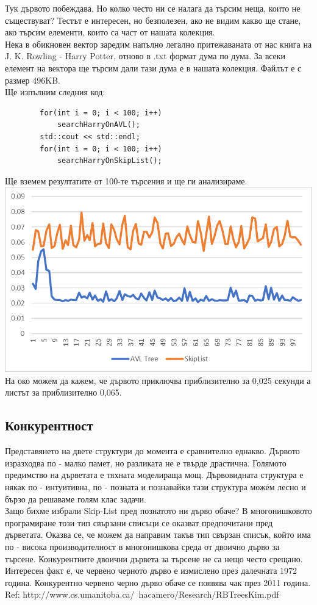 \documentclass[a4paper,12pt,fleqn]{article}
\begin{document}
	Тук дървото побеждава. Но колко често ни се налага да търсим неща, които не съществуват? Тестът е интересен, но безполезен, ако не видим какво ще стане, ако търсим елементи, които са част от нашата колекция.\\
	Нека в обикновен вектор заредим напълно легално притежаваната от нас книга на J. K. Rowling - Harry Potter, отново в .txt формат дума по дума. За всеки елемент на вектора ще търсим дали тази дума е в нашата колекция. Файлът е с размер 496KB.\\
	Ще изпълним следния код:\\
	\begin{lstlisting}
		for(int i = 0; i < 100; i++)
			searchHarryOnAVL();
		std::cout << std::endl;
		for(int i = 0; i < 100; i++)
			searchHarryOnSkipList();
	\end{lstlisting}
	Ще вземем резултатите от 100-те търсения и ще ги анализираме.\\
	\includegraphics[scale=0.5]{searches.png}\\
	На око можем да кажем, че дървото приключва приблизително за 0,025 секунди а листът за приблизително 0,065. 

\subsection{Конкурентност}
Представянето на двете структури до момента е сравнително еднакво. Дървото изразходва по - малко памет, но разликата не е твърде драстична. Голямото предимство на дърветата е тяхната моделираща мощ. Дървовидната структура е някак по - интуитивна, по - позната и познавайки тази структура можем лесно и бързо да решаваме голям клас задачи.\\
Защо бихме избрали Skip-List пред познатото ни дърво обаче? В многонишковото програмиране този тип свързани списъци се оказват предпочитани пред дърветата.
Оказва се, че можем да направим такъв тип свързан списък, който има по - висока производителност в многонишкова среда от двоично дърво за търсене. Конкурентните двоични дървета за търсене не са нещо често срещано. Интересен факт е, че червено черното дърво е измислено през далечната 1972 година. Конкурентно червено черно дърво обаче се появява чак през 2011 година.\\
Ref: http://www.cs.umanitoba.ca/~hacamero/Research/RBTreesKim.pdf\\
\end{document}
